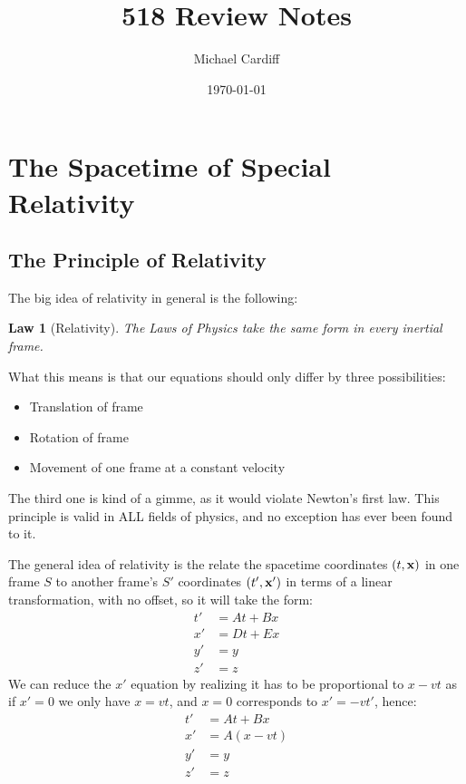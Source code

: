 \documentclass[12pt]{article}
\title{\vspace{-3em}518 Review Notes}
\author{Michael Cardiff}
\date{\today}
\newtheorem{law}{Law}
\begin{document}
\maketitle
\section{The Spacetime of Special Relativity}

\subsection{The Principle of Relativity}
The big idea of relativity in general is the following:
\begin{law}[Relativity]
  The Laws of Physics take the same form in every inertial frame.
\end{law}
What this means is that our equations should only differ by three possibilities:
\begin{itemize}
\item Translation of frame
\item Rotation of frame
\item Movement of one frame at a constant velocity
\end{itemize}
The third one is kind of a gimme, as it would violate Newton's first law. This principle is valid in ALL fields of physics, and no exception has ever been found to it.

The general idea of relativity is the relate the spacetime coordinates $(t,\vb{x})$ in one frame $S$ to another frame's $S'$ coordinates $(t',\vb{x}')$ in terms of a linear transformation, with no offset, so it will take the form:
\begin{align*}
  t'&=At+Bx\\
  x'&=Dt+Ex\\
  y'&=y\\
  z'&=z
\end{align*}
We can reduce the $x'$ equation by realizing it has to be proportional to $x-vt$ as if $x'=0$ we only have $x=vt$, and $x=0$ corresponds to $x'=-vt'$, hence:
\begin{align*}
  t'&=At+Bx\\
  x'&=A(x-vt)\\
  y'&=y\\
  z'&=z
\end{align*}
\end{document}
